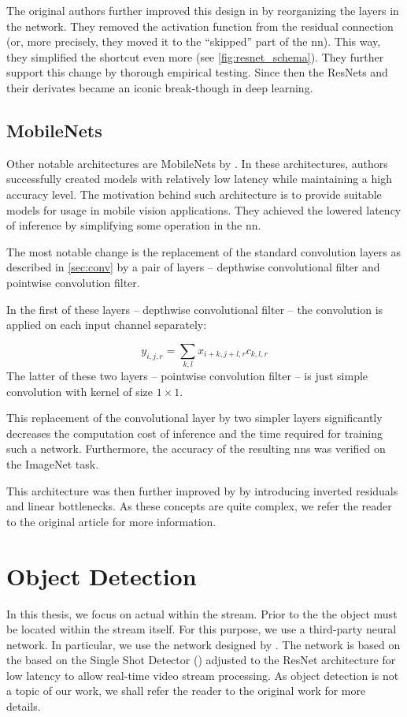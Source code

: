 The original authors further improved this design in \cite{resnetimp} by reorganizing the layers in the network. They removed the activation function from the residual connection (or, more precisely, they moved it to the ``skipped'' part of the \gls{nn}). This way, they simplified the shortcut even more (see \autoref{fig:resnet_schema}). They further support this change by thorough empirical testing. Since then the ResNets and their derivates became an iconic break-though in deep learning.

\subsection{MobileNets}

\label{ssec:mobilenet}

Other notable architectures are MobileNets by \cite{mobilenets}. In these architectures, authors successfully created models with relatively low latency while maintaining a high accuracy level. The motivation behind such architecture is to provide suitable models for usage in mobile vision applications. They achieved the lowered latency of inference by simplifying some operation in the \gls{nn}.

The most notable change is the replacement of the standard convolution layers as described in \autoref{sec:conv} by a pair of layers -- depthwise convolutional filter and pointwise convolution filter.

In the first of these layers -- depthwise convolutional filter -- the convolution is applied on each input channel separately:

$$y_{i, j, r} = \sum_{k, l} x_{i+k, j+l, r} c_{k, l, r}$$
The latter of these two layers -- pointwise convolution filter -- is just simple convolution with kernel of size $1 \times 1$.

This replacement of the convolutional layer by two simpler layers significantly decreases the computation cost of inference and the time required for training such a network. Furthermore, the accuracy of the resulting \glspl{nn} was verified on the ImageNet task.

This architecture was then further improved by \cite{mobilenetv2} by introducing inverted residuals and linear bottlenecks. As these concepts are quite complex, we refer the reader to the original article for more information.


\section{Object Detection}

In this thesis, we focus on actual \reid{} within the stream. Prior to the \reid{} the object must be located within the stream itself. For this purpose, we use a third-party neural network. In particular, we use the network designed by \cite{dobransky2019}. The network is based on the based on the Single Shot Detector (\cite{liu2016ssd}) adjusted to the ResNet architecture for low latency to allow real-time video stream processing. As object detection is not a topic of our work, we shall refer the reader to the original work for more details.

